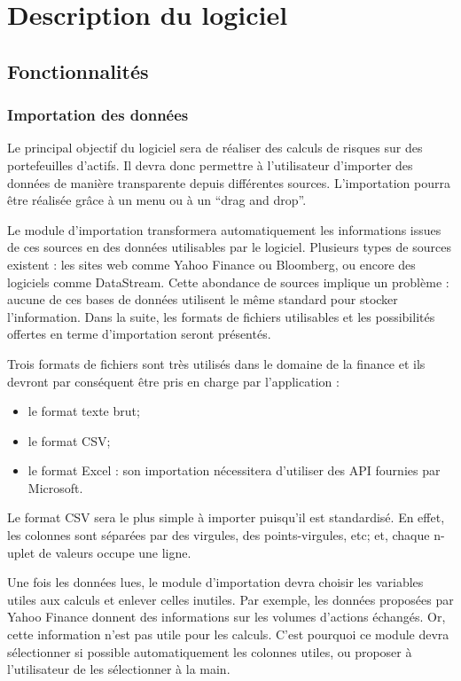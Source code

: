\chapter{Description du logiciel}

\section{Fonctionnalités}

	\subsection{Importation des données}
		Le principal objectif du logiciel sera de réaliser des calculs de risques sur des portefeuilles d'actifs. Il devra donc permettre à l'utilisateur d'importer des données de manière transparente depuis différentes sources. L'importation pourra être réalisée grâce à un menu ou à un “drag and drop”. 

		Le module d'importation transformera automatiquement les informations issues de ces sources en des données utilisables par le logiciel. Plusieurs types de sources existent : les sites web comme Yahoo Finance ou Bloomberg, ou encore des logiciels comme DataStream. Cette abondance de sources implique un problème : aucune de ces bases de données utilisent le même standard pour stocker l'information. Dans la suite, les formats de fichiers utilisables et les possibilités offertes en terme d'importation seront présentés.

		Trois formats de fichiers sont très utilisés dans le domaine de la finance et ils devront par conséquent être pris en charge par l'application :
		\begin{itemize}
			\item le format texte brut;
			\item le format CSV;
			\item le format Excel : son importation nécessitera d'utiliser des API fournies par Microsoft.
		\end{itemize}

		Le format CSV sera le plus simple à importer puisqu'il est standardisé. En effet, les colonnes sont séparées par des virgules, des points-virgules, etc; et, chaque n-uplet de valeurs occupe une ligne.

		Une fois les données lues, le module d'importation devra choisir les variables utiles aux calculs et enlever celles inutiles. Par exemple, les données proposées par Yahoo Finance donnent des informations sur les volumes d'actions échangés. Or, cette information n'est pas utile pour les calculs. C'est pourquoi ce module devra sélectionner si possible automatiquement les colonnes utiles, ou proposer à l'utilisateur de les sélectionner à la main. 

